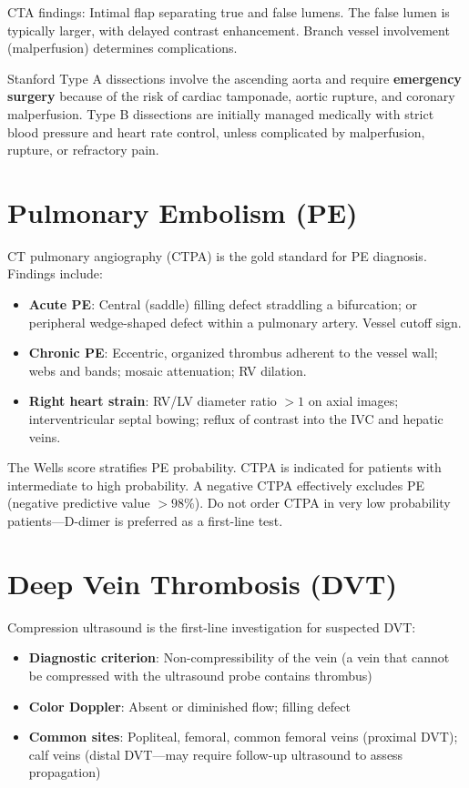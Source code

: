 CTA findings: Intimal flap separating true and false lumens. The false lumen is typically larger, with delayed contrast enhancement. Branch vessel involvement (malperfusion) determines complications.

\begin{pearlbox}
Stanford Type A dissections involve the ascending aorta and require \textbf{emergency surgery} because of the risk of cardiac tamponade, aortic rupture, and coronary malperfusion. Type B dissections are initially managed medically with strict blood pressure and heart rate control, unless complicated by malperfusion, rupture, or refractory pain.
\end{pearlbox}


\section{Pulmonary Embolism (PE)}
CT pulmonary angiography (CTPA) is the gold standard for PE diagnosis. Findings include:

\begin{itemize}
  \item \textbf{Acute PE}: Central (saddle) filling defect straddling a bifurcation; or peripheral wedge-shaped defect within a pulmonary artery. Vessel cutoff sign.
  \item \textbf{Chronic PE}: Eccentric, organized thrombus adherent to the vessel wall; webs and bands; mosaic attenuation; RV dilation.
  \item \textbf{Right heart strain}: RV/LV diameter ratio $> 1$ on axial images; interventricular septal bowing; reflux of contrast into the IVC and hepatic veins.
\end{itemize}

\begin{pearlbox}
The Wells score stratifies PE probability. CTPA is indicated for patients with intermediate to high probability. A negative CTPA effectively excludes PE (negative predictive value $> 98\%$). Do not order CTPA in very low probability patients---D-dimer is preferred as a first-line test.
\end{pearlbox}


\section{Deep Vein Thrombosis (DVT)}
Compression ultrasound is the first-line investigation for suspected DVT:
\begin{itemize}
  \item \textbf{Diagnostic criterion}: Non-compressibility of the vein (a vein that cannot be compressed with the ultrasound probe contains thrombus)
  \item \textbf{Color Doppler}: Absent or diminished flow; filling defect
  \item \textbf{Common sites}: Popliteal, femoral, common femoral veins (proximal DVT); calf veins (distal DVT---may require follow-up ultrasound to assess propagation)
\end{itemize}


